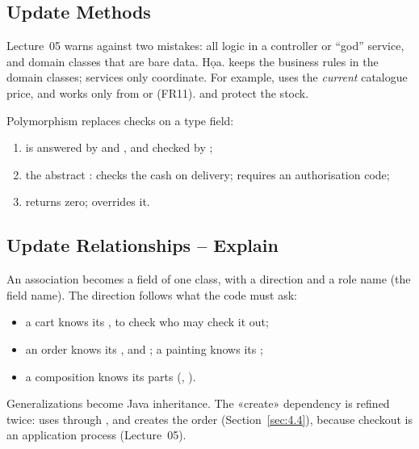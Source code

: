 \subsection{Update Methods}\label{sec:4.3.2}

Lecture~05 warns against two mistakes: all logic in a controller or ``god'' service, and domain classes that are
bare data. Họa. keeps the business rules in the domain classes; services only coordinate. For example,
 uses the \emph{current} catalogue price, and  works only from
 or  (FR11).  and  protect the stock.

Polymorphism replaces checks on a type field:
\begin{enumerate}
\item {} is answered by  and , and checked by ;
\item the abstract :  checks the cash on delivery;  requires an
authorisation code;
\item {} returns zero;  overrides it.
\end{enumerate}

\subsection{Update Relationships -- Explain}\label{sec:4.3.3}

An association becomes a field of one class, with a direction and a role name (the field name). The direction
follows what the code must ask:
\begin{itemize}
\item a cart knows its , to check who may check it out;
\item an order knows its ,  and ; a painting knows its ;
\item a composition knows its parts (, ).
\end{itemize}
Generalizations become Java inheritance. The «create» dependency is refined twice:  uses
 through , and  creates the order (Section~\ref{sec:4.4}),
because checkout is an application process (Lecture~05).


